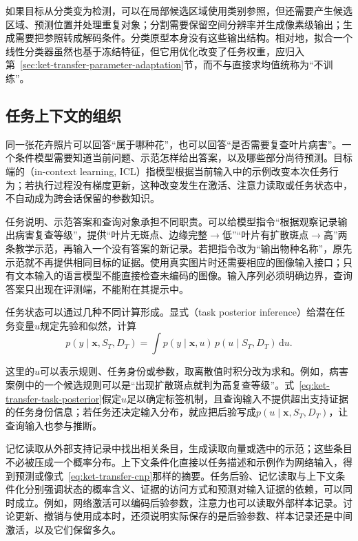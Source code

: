 如果目标从分类变为检测，可以在局部候选区域使用类别参照，但还需要产生候选区域、预测位置并处理重复对象；分割需要保留空间分辨率并生成像素级输出；生成需要把参照转成解码条件。分类原型本身没有这些输出结构。相对地，拟合一个线性分类器虽然也基于冻结特征，但它用优化改变了任务权重，应归入第~\ref{sec:ket-transfer-parameter-adaptation}节，而不与直接求均值统称为“不训练”。

\subsection{任务上下文的组织}
\label{sec:ket-transfer-context}

同一张花卉照片可以回答“属于哪种花”，也可以回答“是否需要复查叶片病害”。一个条件模型需要知道当前问题、示范怎样给出答案，以及哪些部分尚待预测。目标端的（in-context learning, ICL）指模型根据当前输入中的示例改变本次任务行为；若执行过程没有梯度更新，这种改变发生在激活、注意力读取或任务状态中，不自动成为跨会话保留的参数知识。

任务说明、示范答案和查询对象承担不同职责。可以给模型指令“根据观察记录输出病害复查等级”，提供“叶片无斑点、边缘完整$\rightarrow$低”“叶片有扩散斑点$\rightarrow$高”两条教学示范，再输入一个没有答案的新记录。若把指令改为“输出物种名称”，原先示范就不再提供相同目标的证据。使用真实图片时还需要相应的图像输入接口；只有文本输入的语言模型不能直接检查未编码的图像。输入序列必须明确边界，查询答案只出现在评测端，不能附在其提示中。

任务状态可以通过几种不同计算形成。显式（task posterior inference）给潜在任务变量$u$规定先验和似然，计算
\begin{equation}
  p(y\mid\bm x,S_T,D_T)
  =\int p(y\mid\bm x,u)\,
          p(u\mid S_T,D_T)\,\mathrm du.
  \label{eq:ket-transfer-task-posterior}
\end{equation}
\begin{samepage}
这里的$u$可以表示规则、任务身份或参数，取离散值时积分改为求和。例如，病害案例中的一个候选规则可以是“出现扩散斑点就判为高复查等级”。式~\eqref{eq:ket-transfer-task-posterior}假定$u$足以确定标签机制，且查询输入不提供超出支持证据的任务身份信息；若任务还决定输入分布，就应把后验写成$p(u\mid\bm x,S_T,D_T)$，让查询输入也参与推断。

\end{samepage}

记忆读取从外部支持记录中找出相关条目，生成读取向量或选中的示范；这些条目不必被压成一个概率分布。上下文条件化直接以任务描述和示例作为网络输入，得到预测或像式~\eqref{eq:ket-transfer-cnp}那样的摘要。任务后验、记忆读取与上下文条件化分别强调状态的概率含义、证据的访问方式和预测对输入证据的依赖，可以同时成立。例如，网络激活可以编码后验参数，注意力也可以读取外部样本记录。讨论更新、撤销与使用成本时，还须说明实际保存的是后验参数、样本记录还是中间激活，以及它们保留多久。

